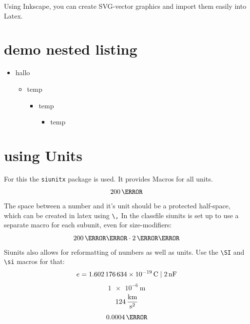\documentclass[	%
		11pt,a4paper,	%
		twoside,		%
		english,		%
		f1				%
	]{HsH-report}		%
\begin{document}
	Using Inkscape, you can create SVG-vector graphics and import them easily into Latex.

	\pagebreak
\section{demo nested listing}
	\begin{itemize}
		\item hallo
		\begin{itemize}
			\item temp
			\begin{itemize}
				\item temp
				\begin{itemize}
					\item temp
				\end{itemize}
			\end{itemize}
		\end{itemize}
	\end{itemize}


\section{using Units}
	For this the \lstinline{siunitx} package is used. It provides Macros for all units.
	\begin{equation}
		200\,\kg
	\end{equation}
	The space between a number and it's unit should be a protected half-space, which can be created in latex using \lstinline{\,} In the classfile
	siunits is set up to use a separate macro for each subunit, even for size-modifiers:
	\begin{equation}
		200\,\milli\metre \cdot 2\,\mega\volt
	\end{equation}
	Siunits also allows for reformatting of numbers as well as units. Use the \lstinline{\SI} and \lstinline{\si} macros for that:
	\begin{equation}
		e = \SI{1.602176634E-19}{\coulomb} %
		\;|\; \SI[exponent-to-prefix]{2e-9}{\farad} %
	\end{equation}
	\begin{equation}
		\SI[exponent-to-prefix]{1e-6}{\metre}
	\end{equation}
	\begin{equation}
		124\,\si[per-mode=fraction]{\kilo\metre\per\second\squared} %
	\end{equation}
	\begin{equation}
		\num{0.0004}\,\lumen %
	\end{equation}
\end{document}

